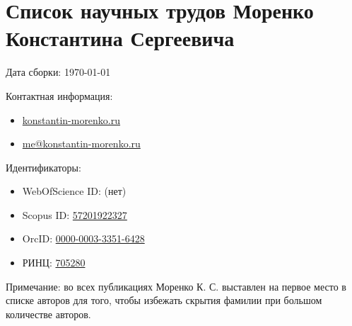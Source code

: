 \documentclass[onecolumn]{article}
\begin{document}
\section*{Список научных трудов Моренко Константина Сергеевича}

Дата сборки: \today

Контактная информация:
\begin{itemize}
  \item \href{https://konstantin-morenko.ru}{konstantin-morenko.ru}
  \item \href{mailto://me@konstantin-morenko.ru}{me@konstantin-morenko.ru}
\end{itemize}

Идентификаторы:
\begin{itemize}
  \item WebOfScience ID: (нет)
  \item Scopus ID: \href{https://www2.scopus.com/authid/detail.uri?authorId=57201922327}{57201922327}
  \item OrcID: \href{https://orcid.org/0000-0003-3351-6428}{0000-0003-3351-6428}
  \item РИНЦ: \href{https://elibrary.ru/author_items.asp?authorid=705280}{705280}
\end{itemize}

Примечание: во всех публикациях Моренко К. С. выставлен на первое
место в списке авторов для того, чтобы избежать скрытия фамилии при
большом количестве авторов.

\nocite{*}

\printbibliography[%
  keyword=konstantin-morenko,
  type=article,
  heading=subbibliography,
  title={Статьи в журналах},
]
\printbibliography[%
  keyword=konstantin-morenko,
  type=incollection,
  heading=subbibliography,
  title={Статьи в сборниках},
]
\printbibliography[%
  keyword=konstantin-morenko,
  type=book,
  heading=subbibliography,
  title={Книги},
]
\printbibliography[%
  keyword=konstantin-morenko,
  type=inbook,
  heading=subbibliography,
  title={Главы в книгах},
]
\printbibliography[%
  keyword=konstantin-morenko,
  type=patent,
  heading=subbibliography,
  title={Патенты и~заявки на изобретения},
]
\printbibliography[%
  keyword=konstantin-morenko,
  nottype=book, nottype=article, nottype=patent, nottype=collection, nottype=incollection, nottype=inbook,
  heading=subbibliography,
  title={Прочие труды},
]
\end{document}
